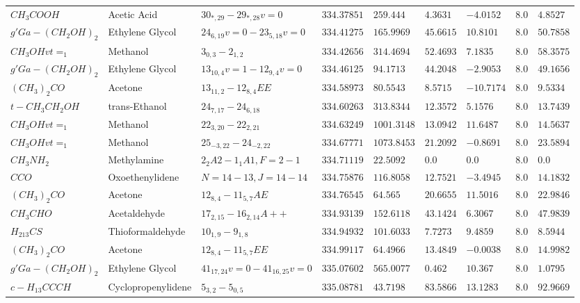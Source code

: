 \documentclass{aa}
\begin{document}
\begin{table}
\begin{tabular}{l l l l l l l l l}
$CH_{3}COOH$ & Acetic Acid & $30_{*,29}-29_{*,28}v=0$ & $334.37851$ & $259.444$ & $4.3631$ & $-4.0152$ & $8.0$ & $4.8527$\\
$g'Ga-(CH_{2}OH)_{2}$ & Ethylene Glycol & $24_{6,19}v=0-23_{5,18}v=0$ & $334.41275$ & $165.9969$ & $45.6615$ & $10.8101$ & $8.0$ & $50.7858$\\
$CH_{3}OHvt=_{1}$ & Methanol & $3_{0,3}-2_{1,2}$ & $334.42656$ & $314.4694$ & $52.4693$ & $7.1835$ & $8.0$ & $58.3575$\\
$g'Ga-(CH_{2}OH)_{2}$ & Ethylene Glycol & $13_{10,4}v=1-12_{9,4}v=0$ & $334.46125$ & $94.1713$ & $44.2048$ & $-2.9053$ & $8.0$ & $49.1656$\\
$(CH_{3})_{2}CO$ & Acetone & $13_{11,2}-12_{8,4}EE$ & $334.58973$ & $80.5543$ & $8.5715$ & $-10.7174$ & $8.0$ & $9.5334$\\
$t-CH_{3}CH_{2}OH$ & trans-Ethanol & $24_{7,17}-24_{6,18}$ & $334.60263$ & $313.8344$ & $12.3572$ & $5.1576$ & $8.0$ & $13.7439$\\
$CH_{3}OHvt=_{1}$ & Methanol & $22_{3,20}-22_{2,21}$ & $334.63249$ & $1001.3148$ & $13.0942$ & $11.6487$ & $8.0$ & $14.5637$\\
$CH_{3}OHvt=_{1}$ & Methanol & $25_{-3,22}-24_{-2,22}$ & $334.67771$ & $1073.8453$ & $21.2092$ & $-0.8691$ & $8.0$ & $23.5894$\\
$CH_{3}NH_{2}$ & Methylamine & $2_{2}A2-1_{1}A1,F=2-1$ & $334.71119$ & $22.5092$ & $0.0$ & $0.0$ & $8.0$ & $0.0$\\
$CCO$ & Oxoethenylidene & $N=14-13,J=14-14$ & $334.75876$ & $116.8058$ & $12.7521$ & $-3.4945$ & $8.0$ & $14.1832$\\
$(CH_{3})_{2}CO$ & Acetone & $12_{8,4}-11_{5,7}AE$ & $334.76545$ & $64.565$ & $20.6655$ & $11.5016$ & $8.0$ & $22.9846$\\
$CH_{3}CHO$ & Acetaldehyde & $17_{2,15}-16_{2,14}A++$ & $334.93139$ & $152.6118$ & $43.1424$ & $6.3067$ & $8.0$ & $47.9839$\\
$H_{213}CS$ & Thioformaldehyde & $10_{1,9}-9_{1,8}$ & $334.94932$ & $101.6033$ & $7.7273$ & $9.4859$ & $8.0$ & $8.5944$\\
$(CH_{3})_{2}CO$ & Acetone & $12_{8,4}-11_{5,7}EE$ & $334.99117$ & $64.4966$ & $13.4849$ & $-0.0038$ & $8.0$ & $14.9982$\\
$g'Ga-(CH_{2}OH)_{2}$ & Ethylene Glycol & $41_{17,24}v=0-41_{16,25}v=0$ & $335.07602$ & $565.0077$ & $0.462$ & $10.367$ & $8.0$ & $1.0795$\\
$c-H_{13}CCCH$ & Cyclopropenylidene & $5_{3,2}-5_{0,5}$ & $335.08781$ & $43.7198$ & $83.5866$ & $13.1283$ & $8.0$ & $92.9669$\\

\end{tabular}
\end{table}
\end{document}
